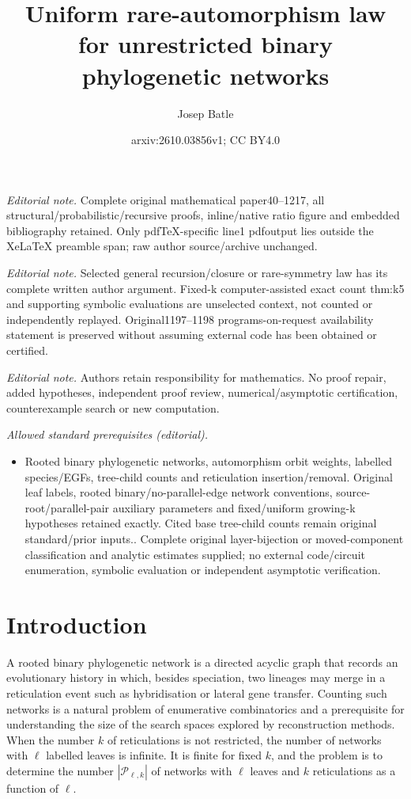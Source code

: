 \documentclass[11pt,a4paper]{article}
\title{Uniform rare-automorphism law for unrestricted binary phylogenetic networks}
\author{Josep Batle}
\date{arxiv:2610.03856v1; CC BY4.0}
\theoremstyle{definition}
\newcommand{\cP}{\mathcal{P}}
\begin{document}
\maketitle
\noindent\textit{Editorial note.} Complete original mathematical paper40--1217, all structural/probabilistic/recursive proofs, inline/native ratio figure and embedded bibliography retained. Only pdfTeX-specific line1 pdfoutput lies outside the XeLaTeX preamble span; raw author source/archive unchanged.\par\medskip
\noindent\textit{Editorial note.} Selected general recursion/closure or rare-symmetry law has its complete written author argument. Fixed-k computer-assisted exact count thm:k5 and supporting symbolic evaluations are unselected context, not counted or independently replayed. Original1197--1198 programs-on-request availability statement is preserved without assuming external code has been obtained or certified.\par\medskip
\noindent\textit{Editorial note.} Authors retain responsibility for mathematics. No proof repair, added hypotheses, independent proof review, numerical/asymptotic certification, counterexample search or new computation.\par\medskip
\noindent\textit{Allowed standard prerequisites (editorial).}\begin{itemize}
\item Rooted binary phylogenetic networks, automorphism orbit weights, labelled species/EGFs, tree-child counts and reticulation insertion/removal. Original leaf labels, rooted binary/no-parallel-edge network conventions, source-root/parallel-pair auxiliary parameters and fixed/uniform growing-k hypotheses retained exactly. Cited base tree-child counts remain original standard/prior inputs.. Complete original layer-bijection or moved-component classification and analytic estimates supplied; no external code/circuit enumeration, symbolic evaluation or independent asymptotic verification.
\end{itemize}\medskip
\section{Introduction}\label{sec:intro}

A rooted binary phylogenetic network is a directed acyclic graph that records an evolutionary history in which, besides speciation, two lineages may merge in a reticulation event such as hybridisation or lateral gene transfer. Counting such networks is a natural problem of enumerative combinatorics and a prerequisite for understanding the size of the search spaces explored by reconstruction methods. When the number $k$ of reticulations is not restricted, the number of networks with $\ell$ labelled leaves is infinite. It is finite for fixed $k$, and the problem is to determine the number $|\cP_{\ell,k}|$ of networks with $\ell$ leaves and $k$ reticulations as a function of $\ell$.
\end{document}
